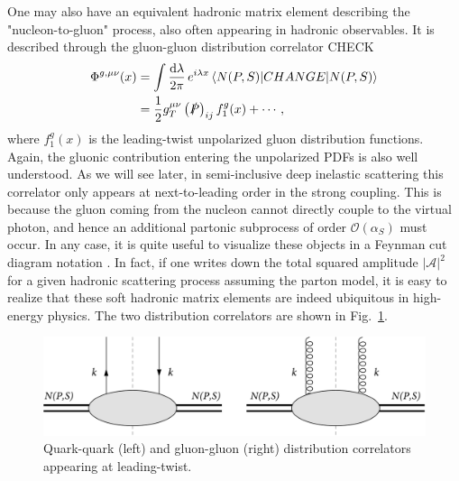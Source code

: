 One may also have an equivalent hadronic matrix element describing the "nucleon-to-gluon" process, also often appearing in hadronic observables. It is described through the gluon-gluon distribution correlator CHECK
\begin{equation}
    \begin{aligned}
        \Phi^{g,\mu\nu}(x)&= \int\frac{\dd \lambda}{2\pi} \,e^{i\lambda x}\mel{N(P,S)}{CHANGE}{N(P,S)}\\
        &= \frac{1}{2}g_T^{\mu\nu}\left(\slashed{P}\right)_{ij} f^g_1(x)+\cdots,
    \end{aligned}
\end{equation}
where $f_1^g(x)$ is the leading-twist unpolarized gluon distribution functions. Again, the gluonic contribution entering the unpolarized PDFs is also well understood. As we will see later, in semi-inclusive deep inelastic scattering this correlator only appears at next-to-leading order in the strong coupling. This is because the gluon coming from the nucleon cannot directly couple to the virtual photon, and hence an additional partonic subprocess of order $\mathcal{O}(\alpha_S)$ must occur. In any case, it is quite useful to visualize these objects in a Feynman cut diagram notation \cite{handbookqcdsterman95,Collins_2011}. In fact, if one writes down the total squared amplitude $|\mathcal{A}|^2$ for a given hadronic scattering process assuming the parton model, it is easy to realize that these soft hadronic matrix elements are indeed ubiquitous in high-energy physics. The two distribution correlators are shown in Fig.~\ref{fig:distribution corr}.

\begin{figure}[h]
    \centering
    \includegraphics[width=0.8\linewidth]{fig/phi corr.png}
    \caption{Quark-quark (left) and gluon-gluon (right) distribution correlators appearing at leading-twist.}
    \label{fig:distribution corr}
\end{figure}

